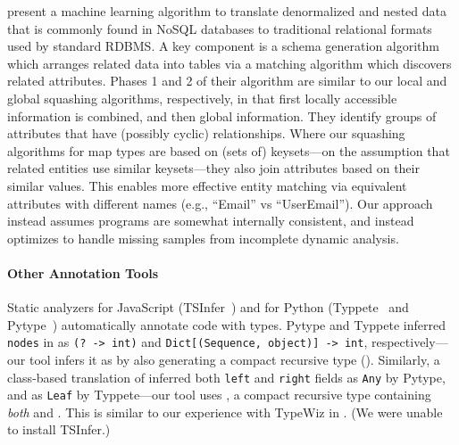 present a machine learning algorithm to translate denormalized
and nested data that is commonly found in NoSQL databases to traditional
relational formats used by standard RDBMS.
A key component is a schema generation algorithm which arranges related
data into tables via a matching algorithm which discovers related attributes.
Phases 1 and 2 of their algorithm are similar to our local and global
squashing algorithms, respectively, in that first locally accessible information
is combined, and then global information.
They identify groups of attributes that have (possibly cyclic) relationships.
Where our squashing algorithms for map types are based on (sets of) keysets---on the 
assumption that related entities use similar keysets---they also join attributes
based on their similar values.
This enables more effective entity matching via equivalent attributes
with different names (e.g., ``Email'' vs ``UserEmail'').
Our approach instead assumes programs are somewhat internally consistent, and instead
optimizes to handle missing samples from incomplete dynamic analysis.


\paragraph{Other Annotation Tools}
Static analyzers
for JavaScript
(TSInfer~) and for Python (Typpete~
and Pytype~)
automatically annotate code with types.
Pytype and Typpete inferred \texttt{nodes} in 
as \texttt{(? -> int)}
and \texttt{Dict[(Sequence, object)] -> int}, respectively---our tool 
infers it as \clj{[Op -> Int]} by also generating a compact recursive
type ().
Similarly, a class-based translation of 
inferred both \texttt{left} and \texttt{right}
fields
as \texttt{Any} by Pytype, and as \texttt{Leaf} by Typpete---our tool
uses ,
a compact recursive type containing \emph{both}  and .
This is similar to our experience with TypeWiz in .
(We were unable to install TSInfer.)

